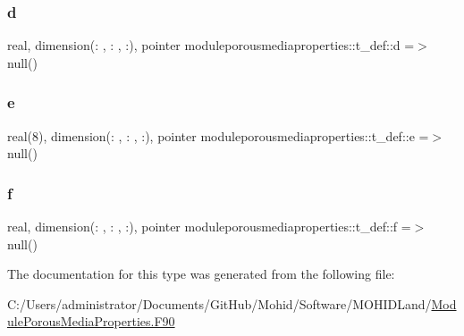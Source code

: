 \subsubsection{\texorpdfstring{d}{d}}
{\footnotesize\ttfamily real, dimension(\+: , \+: , \+:), pointer moduleporousmediaproperties\+::t\+\_\+def\+::d =$>$ null()\hspace{0.3cm}{\ttfamily [private]}}

\mbox{\label{structmoduleporousmediaproperties_1_1t__def_a1995f63ff424862bdd520a62561aa00d}} 
\subsubsection{\texorpdfstring{e}{e}}
{\footnotesize\ttfamily real(8), dimension(\+: , \+: , \+:), pointer moduleporousmediaproperties\+::t\+\_\+def\+::e =$>$ null()\hspace{0.3cm}{\ttfamily [private]}}

\mbox{\label{structmoduleporousmediaproperties_1_1t__def_a2049ff219ae212a11383baea366b6c2e}} 
\subsubsection{\texorpdfstring{f}{f}}
{\footnotesize\ttfamily real, dimension(\+: , \+: , \+:), pointer moduleporousmediaproperties\+::t\+\_\+def\+::f =$>$ null()\hspace{0.3cm}{\ttfamily [private]}}



The documentation for this type was generated from the following file\+:\begin{DoxyCompactItemize}
\item 
C\+:/\+Users/administrator/\+Documents/\+Git\+Hub/\+Mohid/\+Software/\+M\+O\+H\+I\+D\+Land/\mbox{\hyperlink{_module_porous_media_properties_8_f90}{Module\+Porous\+Media\+Properties.\+F90}}\end{DoxyCompactItemize}
